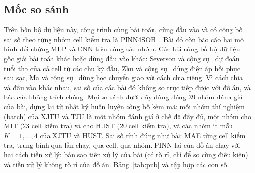\subsection{Mốc so sánh}
Trên bốn bộ dữ liệu này, công trình cùng bài toán, cùng đầu vào và có công bố sai số theo từng nhóm cell kiểm tra là PINN4SOH~\cite{wang2024}. Bài đó còn báo cáo hai mô hình đối chứng MLP và CNN trên cùng các nhóm. Các bài công bố bộ dữ liệu gốc giải bài toán khác hoặc dùng đầu vào khác: Severson và cộng sự~\cite{severson2019} dự đoán tuổi thọ của cả cell từ các chu kỳ đầu, Zhu và cộng sự~\cite{zhu2022} dùng điện áp hồi phục sau sạc, Ma và cộng sự~\cite{ma2022} dùng học chuyển giao với cách chia riêng. Vì cách chia và đầu vào khác nhau, sai số của các bài đó không so trực tiếp được với đồ án, và báo cáo không trích chúng. Mọi so sánh dưới đây dùng đúng 39 nhóm đánh giá của bài, dựng lại từ nhật ký huấn luyện công bố kèm mã: mỗi nhóm thí nghiệm (batch) của XJTU và TJU là một nhóm đánh giá ở chế độ đầy đủ, một nhóm cho MIT (23 cell kiểm tra) và cho HUST (20 cell kiểm tra), và các nhóm ít mẫu $K = 1, \dots, 4$ của XJTU và HUST. Sai số tính đúng như bài: MAE từng cell kiểm tra, trung bình qua lần chạy, qua cell, qua nhóm. PINN-lai của đồ án chạy với hai cách tiền xử lý: bản sao tiền xử lý của bài (có rò rỉ, chỉ để so cùng điều kiện) và tiền xử lý không rò rỉ của đồ án. Bảng~\ref{tab:pub} và  tập hợp các con số.

